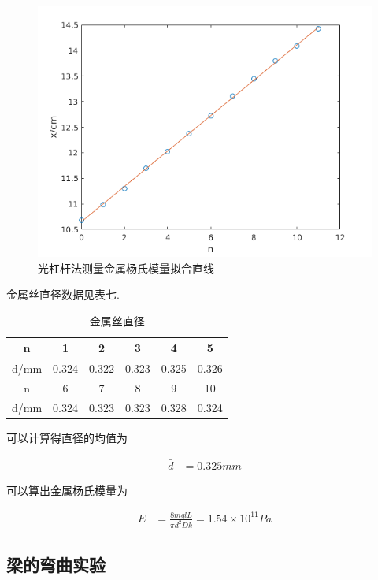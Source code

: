 \documentclass[a4paper,10pt,notitlepage]{article}
\begin{document}
\begin{figure}[h]
\centering
	\includegraphics[scale=0.7]{ym2.png}
	\caption{光杠杆法测量金属杨氏模量拟合直线}
\end{figure}

	金属丝直径数据见表七. \\

\begin{center}

	\begin{longtable}{|c|c|c|c|c|c|}
	\caption{金属丝直径} \\
	\hline
	n & 1 & 2 & 3 & 4 & 5 \\
	\hline
	d/mm & 0.324 & 0.322 & 0.323 & 0.325 & 0.326 \\
	\hline
	\hline
	n & 6 & 7 & 8 & 9 & 10 \\
	\hline
	d/mm & 0.324 & 0.323 & 0.323 & 0.328 & 0.324 \\
	\hline
	\end{longtable}

\end{center}

	可以计算得直径的均值为
	
\begin{align*}
	\bar{d} &= 0.325 mm 
\end{align*}

	可以算出金属杨氏模量为
	
\begin{align*}
	E &= \frac{8mglL}{\pi d^2 D k} = 1.54 \times 10^{11} Pa
\end{align*}
	
\subsection{梁的弯曲实验}
\end{document}
